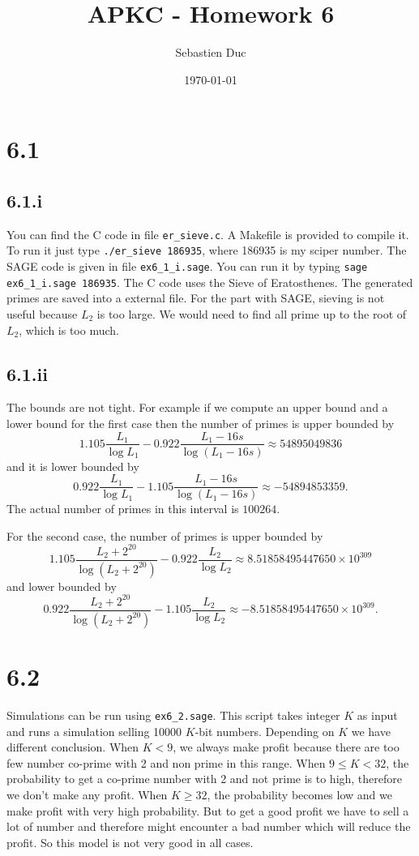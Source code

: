 \documentclass[12pt,a4paper]{article}
\title{APKC - Homework 6}
\author{Sebastien Duc}
\date{\today}
\begin{document}
\maketitle

\section*{6.1}
\subsection*{6.1.i}
You can find the C code in file \texttt{er\_sieve.c}. A Makefile is provided to compile it. To run it just type \texttt{./er\_sieve 186935}, where 186935 is my sciper number.
The SAGE code is given in file \texttt{ex6\_1\_i.sage}. You can run it by typing \texttt{sage ex6\_1\_i.sage 186935}.
The C code uses the Sieve of Eratosthenes. The generated primes are saved into a external file.
For the part with SAGE, sieving is not useful because $L_2$ is too large. We would need to find all prime up to the root of $L_2$, which is too much.

\subsection*{6.1.ii}
The bounds are not tight. For example if we compute an upper bound and a lower bound for the first case then
the number of primes is upper bounded by 
\[
    1.105\frac{L_1}{\log L_1} - 0.922\frac{L_1 - 16s}{\log(L_1-16s)} \approx 54895049836
\]
and it is lower bounded by 
\[
    0.922\frac{L_1}{\log L_1} - 1.105\frac{L_1 - 16s}{\log(L_1 - 16s)} \approx -54894853359.
\] 
The actual number of primes in
this interval is $ 100264$.

For the second case, the number of primes is upper bounded by 
\[
    1.105\frac{L_2+2^{20}}{\log(L_2 + 2^{20})} - 0.922\frac{L_2}{\log L_2} \approx 8.51858495447650\times10^{309}
\]
and lower bounded by \[
    0.922\frac{L_2+2^{20}}{\log(L_2 + 2^{20})} - 1.105\frac{L_2}{\log L_2} \approx -8.51858495447650\times10^{309}.
\]

\section*{6.2}
Simulations can be run using \texttt{ex6\_2.sage}. This script takes integer $K$ as input and runs a simulation selling 10000 $K$-bit numbers.
Depending on $K$ we have different conclusion.
When $K < 9$, we always make profit because there are too few number co-prime with 2 and non prime in this range.
When $ 9 \leq K < 32$, the probability to get a co-prime number with 2 and not prime is to high, therefore we don't make any profit.
When $K \geq 32$, the probability becomes low and we make profit with very high probability. But to get a good profit we have to sell a lot of number and therefore
might encounter a bad number which will reduce the profit. So this model is not very good in all cases.
\end{document}
